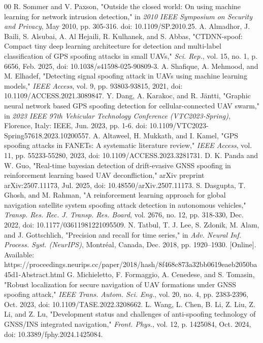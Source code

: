 \documentclass{ieeeaccess}
\begin{document}
\begin{thebibliography}{00}
 R. Sommer and V. Paxson, "Outside the closed world: On using machine learning for network intrusion detection," in \textit{2010 IEEE Symposium on Security and Privacy}, May 2010, pp. 305-316. doi: 10.1109/SP.2010.25.
 A. Almadhor, J. Baili, S. Alsubai, A. Al Hejaili, R. Kulhanek, and S. Abbas, "CTDNN-spoof: Compact tiny deep learning architecture for detection and multi-label classification of GPS spoofing attacks in small UAVs," \textit{Sci. Rep.}, vol. 15, no. 1, p. 6656, Feb. 2025, doi: 10.1038/s41598-025-90809-3.
 A. Shafique, A. Mehmood, and M. Elhadef, "Detecting signal spoofing attack in UAVs using machine learning models," \textit{IEEE Access}, vol. 9, pp. 93803-93815, 2021, doi: 10.1109/ACCESS.2021.3089847.
 Y. Dang, A. Karakoc, and R. Jäntti, "Graphic neural network based GPS spoofing detection for cellular-connected UAV swarm," in \textit{2023 IEEE 97th Vehicular Technology Conference (VTC2023-Spring)}, Florence, Italy: IEEE, Jun. 2023, pp. 1-6. doi: 10.1109/VTC2023-Spring57618.2023.10200557.
 A. Altaweel, H. Mukkath, and I. Kamel, "GPS spoofing attacks in FANETs: A systematic literature review," \textit{IEEE Access}, vol. 11, pp. 55233-55280, 2023, doi: 10.1109/ACCESS.2023.3281731.
 D. K. Panda and W. Guo, "Real-time bayesian detection of drift-evasive GNSS spoofing in reinforcement learning based UAV deconfliction," arXiv preprint arXiv:2507.11173, Jul. 2025, doi: 10.48550/arXiv.2507.11173.
 S. Dasgupta, T. Ghosh, and M. Rahman, "A reinforcement learning approach for global navigation satellite system spoofing attack detection in autonomous vehicles," \textit{Transp. Res. Rec. J. Transp. Res. Board}, vol. 2676, no. 12, pp. 318-330, Dec. 2022, doi: 10.1177/03611981221095509.
 N. Tatbul, T. J. Lee, S. Zdonik, M. Alam, and J. Gottschlich, "Precision and recall for time series," in \textit{Adv. Neural Inf. Process. Syst. (NeurIPS)}, Montr\'eal, Canada, Dec. 2018, pp. 1920--1930. [Online]. Available: https://proceedings.neurips.cc/paper/2018/hash/8f468c873a32bb0619eaeb2050ba45d1-Abstract.html
 G. Michieletto, F. Formaggio, A. Cenedese, and S. Tomasin, "Robust localization for secure navigation of UAV formations under GNSS spoofing attack," \textit{IEEE Trans. Autom. Sci. Eng.}, vol. 20, no. 4, pp. 2383-2396, Oct. 2023, doi: 10.1109/TASE.2022.3208662.
 L. Wang, L. Chen, B. Li, Z. Liu, Z. Li, and Z. Lu, "Development status and challenges of anti-spoofing technology of GNSS/INS integrated navigation," \textit{Front. Phys.}, vol. 12, p. 1425084, Oct. 2024, doi: 10.3389/fphy.2024.1425084.

\end{thebibliography}
\end{document}
